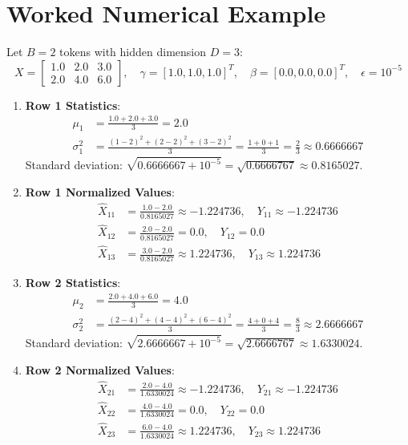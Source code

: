 \documentclass[11pt,a4paper]{article}
\theoremstyle{definition}
\begin{document}
\section{Worked Numerical Example}

Let $B = 2$ tokens with hidden dimension $D = 3$:
\begin{equation}
X = \begin{bmatrix} 1.0 & 2.0 & 3.0 \\ 2.0 & 4.0 & 6.0 \end{bmatrix}, \quad \gamma = [1.0, 1.0, 1.0]^T, \quad \beta = [0.0, 0.0, 0.0]^T, \quad \epsilon = 10^{-5}
\end{equation}

\begin{enumerate}
    \item \textbf{Row 1 Statistics}:
    \begin{align}
    \mu_1 &= \frac{1.0 + 2.0 + 3.0}{3} = 2.0 \\
    \sigma_1^2 &= \frac{(1-2)^2 + (2-2)^2 + (3-2)^2}{3} = \frac{1 + 0 + 1}{3} = \frac{2}{3} \approx 0.6666667
    \end{align}
    Standard deviation: $\sqrt{0.6666667 + 10^{-5}} = \sqrt{0.6666767} \approx 0.8165027$.
    \item \textbf{Row 1 Normalized Values}:
    \begin{align}
    \hat{X}_{11} &= \frac{1.0 - 2.0}{0.8165027} \approx -1.224736, \quad Y_{11} \approx -1.224736 \\
    \hat{X}_{12} &= \frac{2.0 - 2.0}{0.8165027} = 0.0, \quad Y_{12} = 0.0 \\
    \hat{X}_{13} &= \frac{3.0 - 2.0}{0.8165027} \approx 1.224736, \quad Y_{13} \approx 1.224736
    \end{align}
    \item \textbf{Row 2 Statistics}:
    \begin{align}
    \mu_2 &= \frac{2.0 + 4.0 + 6.0}{3} = 4.0 \\
    \sigma_2^2 &= \frac{(2-4)^2 + (4-4)^2 + (6-4)^2}{3} = \frac{4 + 0 + 4}{3} = \frac{8}{3} \approx 2.6666667
    \end{align}
    Standard deviation: $\sqrt{2.6666667 + 10^{-5}} = \sqrt{2.6666767} \approx 1.6330024$.
    \item \textbf{Row 2 Normalized Values}:
    \begin{align}
    \hat{X}_{21} &= \frac{2.0 - 4.0}{1.6330024} \approx -1.224736, \quad Y_{21} \approx -1.224736 \\
    \hat{X}_{22} &= \frac{4.0 - 4.0}{1.6330024} = 0.0, \quad Y_{22} = 0.0 \\
    \hat{X}_{23} &= \frac{6.0 - 4.0}{1.6330024} \approx 1.224736, \quad Y_{23} \approx 1.224736
    \end{align}
\end{enumerate}
\end{document}
